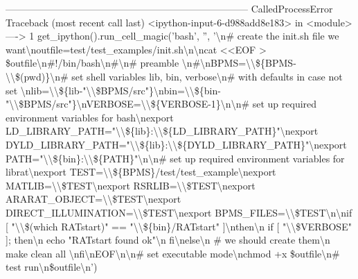 \documentclass[letterpaper,10pt,english]{sphinxmanual}
\begin{document}
{
\begin{sphinxVerbatim}[commandchars=\\\{\}]
\textcolor{ansi-red}{---------------------------------------------------------------------------}
\textcolor{ansi-red}{CalledProcessError}                        Traceback (most recent call last)
\textcolor{ansi-green}{<ipython-input-6-d988add8e183>} in \textcolor{ansi-cyan}{<module>}
\textcolor{ansi-green}{----> 1}\textcolor{ansi-red}{ }get\_ipython\textcolor{ansi-blue}{(}\textcolor{ansi-blue}{)}\textcolor{ansi-blue}{.}run\_cell\_magic\textcolor{ansi-blue}{(}\textcolor{ansi-blue}{'bash'}\textcolor{ansi-blue}{,} \textcolor{ansi-blue}{''}\textcolor{ansi-blue}{,} \textcolor{ansi-blue}{'\textbackslash{}n\# create the init.sh file we want\textbackslash{}noutfile=test/test\_examples/init.sh\textbackslash{}n\textbackslash{}ncat <<EOF > \$outfile\textbackslash{}n\#!/bin/bash\textbackslash{}n\#\textbackslash{}n\# preamble \textbackslash{}n\#\textbackslash{}nBPMS=\textbackslash{}\textbackslash{}\$\{BPMS-\textbackslash{}\textbackslash{}\$(pwd)\}\textbackslash{}n\# set shell variables lib, bin, verbose\textbackslash{}n\# with defaults in case not set \textbackslash{}nlib=\textbackslash{}\textbackslash{}\$\{lib-"\textbackslash{}\textbackslash{}\$BPMS/src"\}\textbackslash{}nbin=\textbackslash{}\textbackslash{}\$\{bin-"\textbackslash{}\textbackslash{}\$BPMS/src"\}\textbackslash{}nVERBOSE=\textbackslash{}\textbackslash{}\$\{VERBOSE-1\}\textbackslash{}n\textbackslash{}n\# set up required environment variables for bash\textbackslash{}nexport LD\_LIBRARY\_PATH="\textbackslash{}\textbackslash{}\$\{lib\}:\textbackslash{}\textbackslash{}\$\{LD\_LIBRARY\_PATH\}"\textbackslash{}nexport DYLD\_LIBRARY\_PATH="\textbackslash{}\textbackslash{}\$\{lib\}:\textbackslash{}\textbackslash{}\$\{DYLD\_LIBRARY\_PATH\}"\textbackslash{}nexport PATH="\textbackslash{}\textbackslash{}\$\{bin\}:\textbackslash{}\textbackslash{}\$\{PATH\}"\textbackslash{}n\textbackslash{}n\# set up required environment variables for librat\textbackslash{}nexport TEST=\textbackslash{}\textbackslash{}\$\{BPMS\}/test/test\_example\textbackslash{}nexport MATLIB=\textbackslash{}\textbackslash{}\$TEST\textbackslash{}nexport RSRLIB=\textbackslash{}\textbackslash{}\$TEST\textbackslash{}nexport ARARAT\_OBJECT=\textbackslash{}\textbackslash{}\$TEST\textbackslash{}nexport DIRECT\_ILLUMINATION=\textbackslash{}\textbackslash{}\$TEST\textbackslash{}nexport BPMS\_FILES=\textbackslash{}\textbackslash{}\$TEST\textbackslash{}n\textbackslash{}nif [ "\textbackslash{}\textbackslash{}\$(which RATstart)" == "\textbackslash{}\textbackslash{}\$\{bin\}/RATstart" ]\textbackslash{}nthen\textbackslash{}n  if [ "\textbackslash{}\textbackslash{}\$VERBOSE" ]; then\textbackslash{}n      echo "RATstart found ok"\textbackslash{}n  fi\textbackslash{}nelse\textbackslash{}n  \# we should create them\textbackslash{}n  make clean all \textbackslash{}nfi\textbackslash{}nEOF\textbackslash{}n\textbackslash{}n\# set executable mode\textbackslash{}nchmod +x \$outfile\textbackslash{}n\# test run\textbackslash{}n\$outfile\textbackslash{}n'}\textcolor{ansi-blue}{)}


\end{sphinxVerbatim}}
\end{document}
